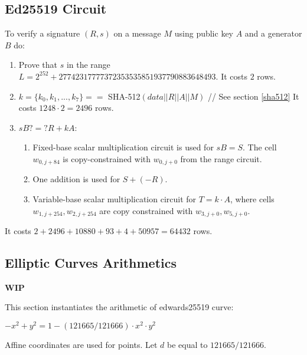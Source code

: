\subsection{Ed25519 Circuit}
\label{section:eddsa}
 
To verify a signature $(R,s)$ on a message $M$ using public key $A$ and a generator $B$ do:
\begin{enumerate}
    \item Prove that $s$ in the range $L = 2^{252}+27742317777372353535851937790883648493$.
	It costs $2$ rows.
    \item $k = \{k_0, k _1, ..., k_7 \} == $ SHA-512$(data||R||A||M)$ // See section \ref{sha512}
    It costs $1248 \cdot 2 = 2496$ rows.
    \item $sB ?=? R + kA$:
        \begin{enumerate}
            \item Fixed-base scalar multiplication circuit is used for $sB = S$. The cell $w_{0, j + 84}$ is copy-constrained with $w_{0, j + 0}$ from the range circuit.
            \item One addition is used for $S + (-R)$. 
            \item Variable-base scalar multiplication circuit for $T = k \cdot A$, where cells $w_{1, j + 254}, w_{2, j + 254}$ are copy constrained with $w_{3, j + 0}, w _{5, j + 0}$.
        \end{enumerate}
\end{enumerate}
It costs $2 + 2496 + 10880 + 93 + 4 + 50957 = 64 432$ rows.
\subsection{Elliptic Curves Arithmetics}
\label{ellcurve}
\textbf{WIP}

This section instantiates the arithmetic of edwards25519 curve:
\begin{center}
    $- x^2 + y^2 = 1 - (121665/121666) \cdot x^2 \cdot y^2$
\end{center}
Affine coordinates are used for points.
Let $d$ be equal to $121665/121666$.

